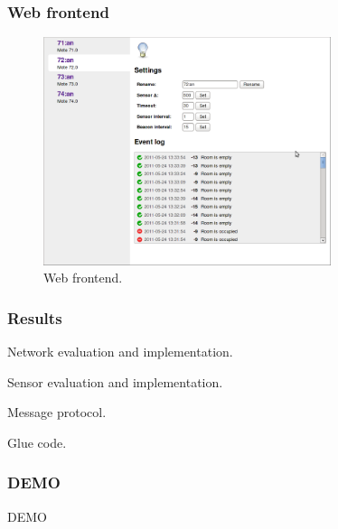 \documentclass{beamer}
\begin{document}
\begin{frame}
\frametitle{Web frontend}

	\begin{center}
		\begin{figure}
			\includegraphics[width=0.75\textwidth]{webfrontend.png}
			\caption{Web frontend.}
		\end{figure}
	\end{center}

\end{frame}

\begin{frame}
\frametitle{Results}

	\begin{block}
		
		Network evaluation and implementation.

	\end{block}	
	
	\begin{block}
				
		Sensor evaluation and implementation.
		
	\end{block}
		
	\begin{block}
		
		Message protocol.
		
	\end{block}

	\begin{block}
		
		Glue code.

	\end{block}

\end{frame}


\begin{frame}
\frametitle{DEMO}
	
	DEMO
	
\end{frame}
\end{document}
